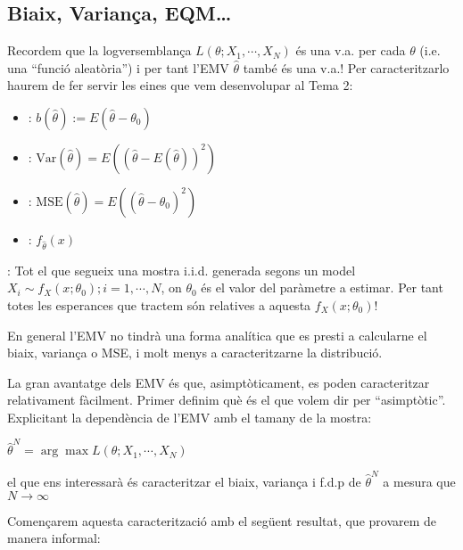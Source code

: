 \documentclass[letterpaper,10pt,english]{sphinxmanual}
\begin{document}
\subsection{Biaix, Variança, EQM…}
\label{\detokenize{0_Intro/0_3_Estimacio:biaix-varianca-eqm}}
Recordem que la log\sphinxhyphen{}versemblança \(L(\theta; X_1, \cdots, X_N)\)
és una v.a. per cada \(\theta\) (i.e. una “funció aleatòria”)
i per tant l’EMV \(\hat{\theta}\) també és una v.a.! Per caracteritzar\sphinxhyphen{}lo
haurem de fer servir les eines que vem desenvolupar al Tema 2:
\begin{itemize}
\item {} 
: \(b(\hat{\theta}) := E(\hat{\theta} - \theta_0)\)

\item {} 
: \(\mbox{Var}(\hat{\theta}) = E((\hat{\theta} - E(\hat{\theta}))^2)\)

\item {} 
: \(\mbox{MSE}(\hat{\theta}) = E((\hat{\theta} - \theta_0)^2)\)

\item {} 
: \(f_{\hat{\theta}}(x)\)

\end{itemize}

: Tot el que segueix  una mostra i.i.d. generada segons un
model \(X_i \sim f_X(x;\theta_0); i=1,\cdots,N\), on \(\theta_0\)
és el valor  del paràmetre a estimar. Per tant totes les esperances
que tractem són relatives a aquesta \(f_X(x;\theta_0)\)!

En general l’EMV no tindrà una forma analítica que es presti a
calcular\sphinxhyphen{}ne el biaix, variança o MSE, i molt menys a
caracteritzar\sphinxhyphen{}ne la distribució.

La gran avantatge dels EMV és que, asimptòticament,
es poden caracteritzar relativament fàcilment. Primer definim
què és el que volem dir per “asimptòtic”. Explicitant la dependència
de l’EMV amb el tamany de la mostra:

\(\hat{\theta}^N = \arg \max  L(\theta; X_1, \cdots, X_N)\)

el que ens interessarà és caracteritzar el biaix, variança i
f.d.p de \(\hat{\theta}^N\) a mesura que \(N \to \infty\)

Començarem aquesta caracterització amb el següent resultat,
que provarem de manera informal:
\end{document}
